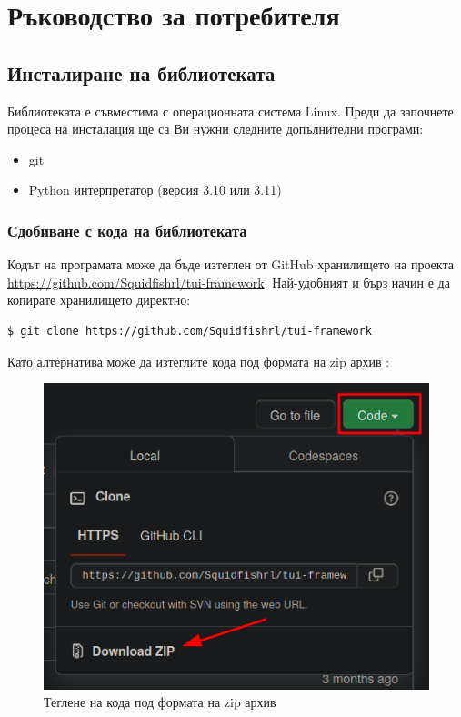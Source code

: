 \chapter{Ръководство за потребителя}
\hfill

\section{Инсталиране на библиотеката}
        Библиотеката е съвместима с операционната система Linux. 
        Преди да започнете процеса на инсталация ще са Ви нужни следните 
        допълнителни програми:

        \begin{itemize}
                \item git
                \item Python интерпретатор (версия 3.10 или 3.11)
        \end{itemize}

        \subsection{Сдобиване с кода на библиотеката}

                Кодът на програмата може да бъде изтеглен от GitHub хранилището
                на проекта \url{https://github.com/Squidfishrl/tui-framework}.
                Най-удобният и бърз начин е да копирате хранилището директно:

                \begin{lstlisting}[style=shell]
                        $ git clone https://github.com/Squidfishrl/tui-framework
                \end{lstlisting}

                Като алтернатива може да изтеглите кода под формата на zip архив
                :
        
                \begin{figure}[h]
                \centering
                \includegraphics[width=\textwidth]{images/download-zip.png}
                \caption{Теглене на кода под формата на zip архив}
                \label{fig:download-zip}
                \end{figure}

